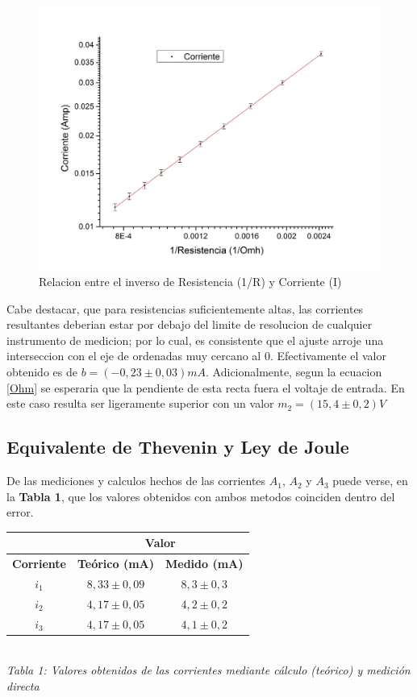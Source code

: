 \documentclass[11pt,a4paper]{article}
\begin{document}
\begin{figure}[h]
  \centering
  \includegraphics[scale=0.15]{Corriente_vs_InversoResistencia}
  \caption{Relacion entre el inverso de Resistencia (1/R) y Corriente (I)}
  \label{fig:Ohm_hip}
\end{figure}

 Cabe destacar, que para resistencias suficientemente altas, las corrientes resultantes deberian estar por debajo del limite de resolucion de cualquier instrumento de medicion; por lo cual, es consistente que el ajuste arroje una interseccion con el eje de ordenadas muy cercano al 0. Efectivamente el valor obtenido es de $b = (-0,23 \pm 0,03)mA$. Adicionalmente, segun la ecuacion \eqref{Ohm} se esperaria que la pendiente de esta recta fuera el voltaje de entrada. En este caso resulta ser ligeramente superior con un valor $m_2 = (15,4 \pm 0,2)V$

\subsection{Equivalente de Thevenin y Ley de Joule}

 
De las mediciones y calculos hechos de las corrientes $A_1$, $A_2$ y $A_3$ puede verse, en la \textbf{Tabla 1}, que los valores obtenidos con ambos metodos coinciden dentro del error. 

\begin{center}
\begin{tabular}{||c|c|c||}
\hline
& \multicolumn{2}{c||}{\textbf{Valor}} \\ \hline
\textbf{Corriente} & \textbf{Teórico (mA)} & \textbf{Medido (mA)} \\ \hline 
$i_1$ & $8,33\pm0,09$ & $8,3\pm0,3$ \\ \hline 
$i_2$ & $4,17\pm0,05$ & $4,2\pm0,2$ \\ \hline 
$i_3$ & $4,17\pm0,05$ & $4,1\pm0,2$ \\ \hline 
\end{tabular}\\[0.3cm]

\textit{Tabla 1: Valores obtenidos de las corrientes mediante cálculo (teórico) y medición directa}
\end{center}
\end{document}
